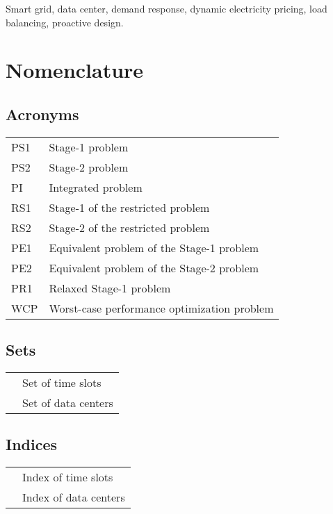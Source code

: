 \documentclass[journal]{IEEEtran}
\begin{document}
	\begin{IEEEkeywords}
		Smart grid, data center, demand response, dynamic electricity pricing, load balancing, proactive design.
	\end{IEEEkeywords}
	
\IEEEpeerreviewmaketitle

\section*{Nomenclature}

\subsection*{Acronyms}
\begin{tabular}{l l} PS1 &Stage-1 problem \\ 
	PS2 &Stage-2 problem \\
	PI &Integrated problem \\
	RS1 &Stage-1 of the restricted problem \\ 
	RS2 &Stage-2 of the restricted problem \\ 
	PE1 &Equivalent problem of the Stage-1 problem \\ 
	PE2 &Equivalent problem of the Stage-2 problem \\ 
	PR1 &Relaxed Stage-1 problem\\
	WCP &Worst-case performance optimization problem
\end{tabular}


\subsection*{Sets}
\begin{tabular}{l l}  &Set of time slots \\ 
	 &Set of data centers  
\end{tabular}


\subsection*{Indices}
\begin{tabular}{l l}  &Index of time slots \\ 
	 &Index of data centers
\end{tabular}
	
	
\end{document}
